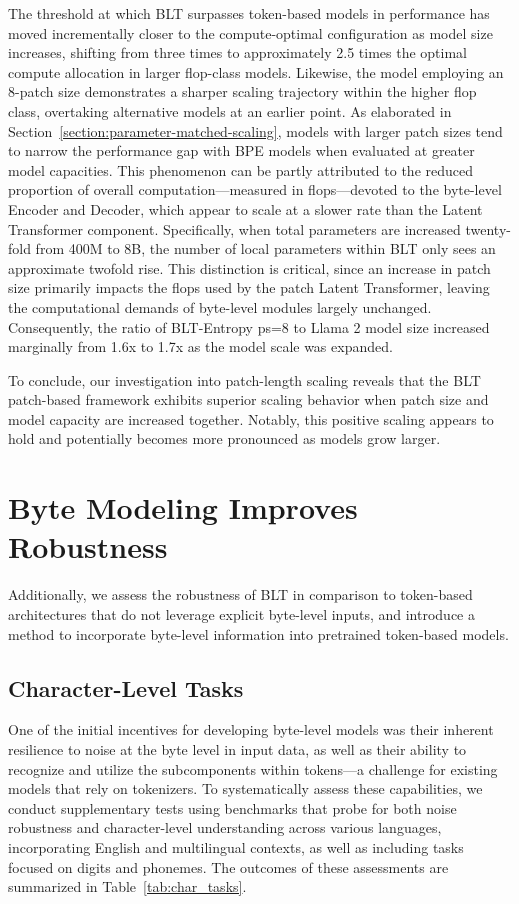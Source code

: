 The threshold at which {\textsc BLT} surpasses token-based models in performance has moved incrementally closer to the compute-optimal configuration as model size increases, shifting from three times to approximately 2.5 times the optimal compute allocation in larger flop-class models. Likewise, the model employing an 8-patch size demonstrates a sharper scaling trajectory within the higher flop class, overtaking alternative models at an earlier point. As elaborated in Section~\ref{section:parameter-matched-scaling}, models with larger patch sizes tend to narrow the performance gap with BPE models when evaluated at greater model capacities. This phenomenon can be partly attributed to the reduced proportion of overall computation—measured in flops—devoted to the byte-level Encoder and Decoder, which appear to scale at a slower rate than the Latent Transformer component. Specifically, when total parameters are increased twenty-fold from 400M to 8B, the number of local parameters within {\textsc BLT} only sees an approximate twofold rise. This distinction is critical, since an increase in patch size primarily impacts the flops used by the patch Latent Transformer, leaving the computational demands of byte-level modules largely unchanged. Consequently, the ratio of {\textsc BLT}-Entropy ps=8 to Llama 2 model size increased marginally from 1.6x to 1.7x as the model scale was expanded.

To conclude, our investigation into patch-length scaling reveals that the {\textsc BLT} patch-based framework exhibits superior scaling behavior when patch size and model capacity are increased together. Notably, this positive scaling appears to hold and potentially becomes more pronounced as models grow larger.

\section{Byte Modeling Improves Robustness} Additionally, we assess the robustness of {\textsc BLT} in comparison to token-based architectures that do not leverage explicit byte-level inputs, and introduce a method to incorporate byte-level information into pretrained token-based models.
\label{sec:robustness}

\subsection{Character-Level Tasks}

One of the initial incentives for developing byte-level models was their inherent resilience to noise at the byte level in input data, as well as their ability to recognize and utilize the subcomponents within tokens—a challenge for existing models that rely on tokenizers. To systematically assess these capabilities, we conduct supplementary tests using benchmarks that probe for both noise robustness and character-level understanding across various languages, incorporating English and multilingual contexts, as well as including tasks focused on digits and phonemes. The outcomes of these assessments are summarized in Table~\ref{tab:char_tasks}.

